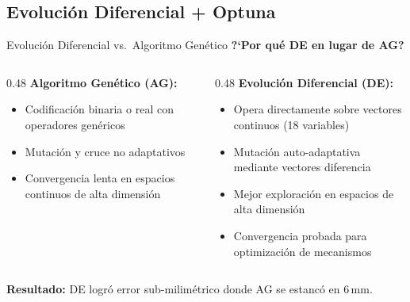 \documentclass[xcolor={table,dvipsnames}]{beamer}
\begin{document}
\subsection{Evoluci\'on Diferencial + Optuna}

\begin{frame}{Evoluci\'on Diferencial vs.\ Algoritmo Gen\'etico}
    \scriptsize
    \textbf{?`Por qu\'e DE en lugar de AG?} \cite{price2005differential, deb2012optimization}
    \vspace{0.2cm}

    \begin{columns}[T]
    \begin{column}{0.48\textwidth}
        \textbf{Algoritmo Gen\'etico (AG):}
        \begin{itemize}
            \item Codificaci\'on binaria o real con operadores gen\'ericos
            \item Mutaci\'on y cruce no adaptativos
            \item Convergencia lenta en espacios continuos de alta dimensi\'on
        \end{itemize}
    \end{column}
    \begin{column}{0.48\textwidth}
        \textbf{Evoluci\'on Diferencial (DE):}
        \begin{itemize}
            \item Opera directamente sobre vectores continuos (18 variables)
            \item Mutaci\'on auto-adaptativa mediante vectores diferencia
            \item Mejor exploraci\'on en espacios de alta dimensi\'on
            \item Convergencia probada para optimizaci\'on de mecanismos
        \end{itemize}
    \end{column}
    \end{columns}

    \vspace{0.3cm}
    \begin{center}
    \textbf{Resultado:} DE logr\'o error sub-milim\'etrico donde AG se estanc\'o en 6\,mm.
    \end{center}
\end{frame}
\end{document}
